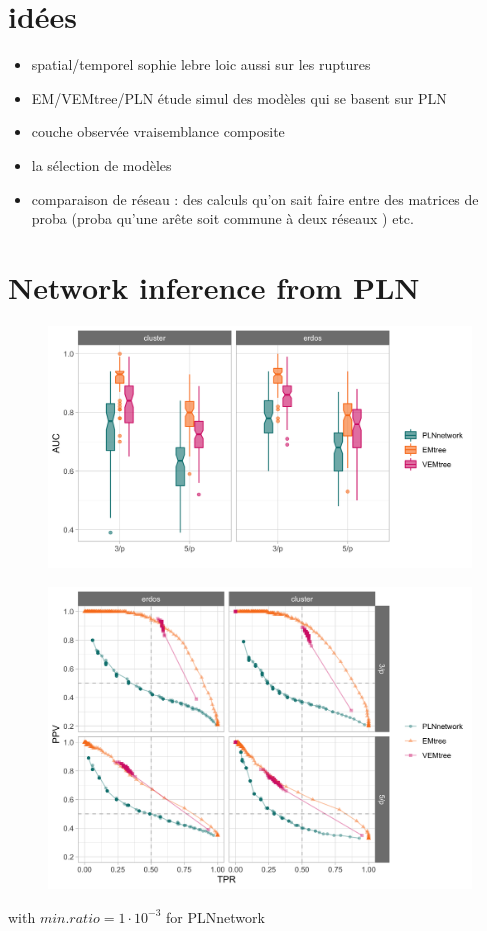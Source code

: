 \section{idées}
\begin{itemize}
\item spatial/temporel sophie lebre loic aussi sur les ruptures
\item EM/VEMtree/PLN étude simul des modèles qui se basent sur PLN
\item couche observée vraisemblance composite
\item la sélection de modèles
\item comparaison de réseau : des calculs qu'on sait faire entre des matrices de proba (proba qu'une arête soit commune à deux réseaux ) etc.
\end{itemize} 

\section{Network inference from PLN}

\begin{figure}
\centering
\includegraphics[width=12cm]{figs/AUC_PLN_EM_VEM.png}
\end{figure}
\begin{figure}
\centering
\includegraphics[width=12cm]{figs/precrec_PLN_EM_VEM.png}
\end{figure}

with $min.ratio=1\cdot 10^{-3}$ for PLNnetwork